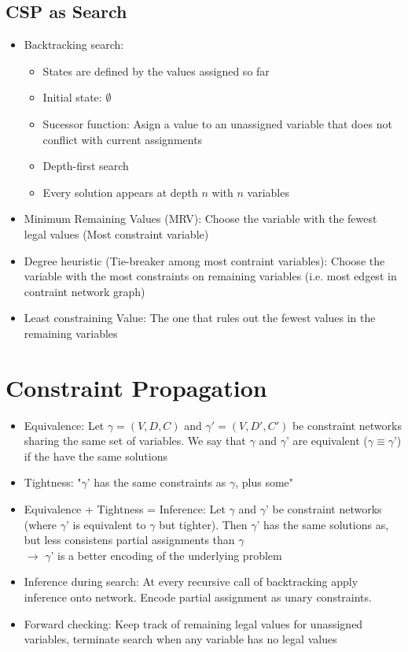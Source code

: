 \documentclass{scrartcl}
\begin{document}
\subsection{CSP as Search}
\begin{itemize}
    \item
        Backtracking search:
        \begin{itemize}
            \item
                States are defined by the values assigned so far
            \item
                Initial state: $\emptyset$
            \item
                Sucessor function: Asign a value to an unassigned variable that does not conflict with current assignments
            \item
                Depth-first search
            \item
                Every solution appears at depth $n$ with $n$ variables
        \end{itemize}
    \item
        Minimum Remaining Values (MRV): Choose the variable with the fewest legal values (Most constraint variable)
    \item
        Degree heuristic (Tie-breaker among most contraint variables): Choose the variable with the most constraints on remaining variables (i.e. most edgest in contraint network graph)
    \item
        Least constraining Value: The one that rules out the fewest values in the remaining variables
\end{itemize}

\section{Constraint Propagation}
\begin{itemize}
    \item
        Equivalence: Let $\gamma = (V, D, C)$ and $\gamma' = (V, D', C')$ be constraint networks sharing the same set of variables. We say that $\gamma$ and $\gamma$' are equivalent ($\gamma \equiv \gamma$') if the have the same solutions
    \item
        Tightness: "$\gamma$' has the same constraints as $\gamma$, plus some"
    \item
        Equivalence + Tightness = Inference: Let $\gamma$ and $\gamma$' be constraint networks (where $\gamma$' is equivalent to $\gamma$ but tighter). Then $\gamma$' has the same solutions as, but less consistens partial assignments than $\gamma$\\
        $\rightarrow$ $\gamma$' is a better encoding of the underlying problem
    \item
        Inference during search: At every recursive call of backtracking apply inference onto network. Encode partial assignment as unary constraints.
    \item
        Forward checking: Keep track of remaining legal values for unassigned variables, terminate search when any variable has no legal values
\end{itemize}
\end{document}
